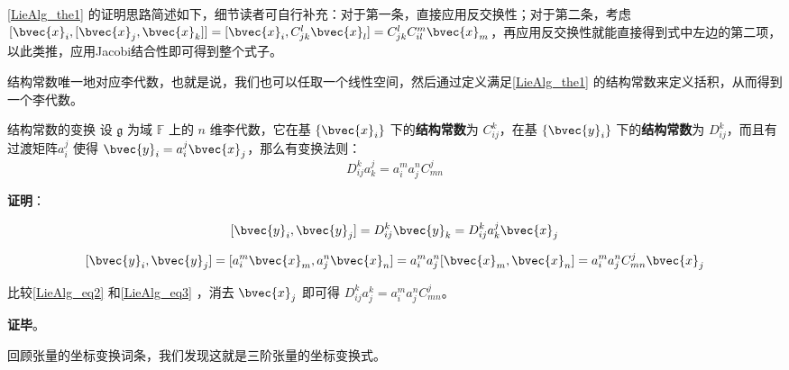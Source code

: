 \autoref{LieAlg_the1} 的证明思路简述如下，细节读者可自行补充：对于第一条，直接应用反交换性；对于第二条，考虑 $[\bvec{x}_i, [\bvec{x}_j, \bvec{x}_k]] = [\bvec{x}_i, C_{jk}^l \bvec{x}_l] = C_{jk}^l C_{il}^m \bvec{x}_m$，再应用反交换性就能直接得到式中左边的第二项，以此类推，应用Jacobi结合性即可得到整个式子。

结构常数唯一地对应李代数，也就是说，我们也可以任取一个线性空间，然后通过定义满足\autoref{LieAlg_the1} 的结构常数来定义括积，从而得到一个李代数。

\begin{theorem}{结构常数的变换}
设 $\mathfrak{g}$ 为域 $\mathbb{F}$ 上的 $n$ 维李代数，它在基 $\{\bvec{x}_i\}$ 下的\textbf{结构常数}为 $C^k_{ij}$，在基 $\{\bvec{y}_i\}$ 下的\textbf{结构常数}为 $D^k_{ij}$，而且有过渡矩阵$a_i^j$ 使得 $\bvec{y}_i=a_i^j\bvec{x}_j$，那么有变换法则：
\begin{equation}
D_{ij}^k a_k^j=a_i^m a_j^n C^j_{mn}
\end{equation}

\end{theorem}

\textbf{证明}：

\begin{equation}\label{LieAlg_eq2}
[\bvec{y}_i, \bvec{y}_j] = D_{ij}^k \bvec{y}_k = D_{ij}^k a_k^j \bvec{x}_j
\end{equation}

\begin{equation}\label{LieAlg_eq3}
[\bvec{y}_i, \bvec{y}_j]=[a_i^m \bvec{x}_m, a_j^n \bvec{x}_n]=a_i^m a_j^n[\bvec{x}_m, \bvec{x}_n]=a_i^m a_j^n C^j_{mn} \bvec{x}_j
\end{equation}

比较\autoref{LieAlg_eq2} 和\autoref{LieAlg_eq3} ，消去 $\bvec{x}_j$ 即可得 $D_{ij}^k a^k_j = a_i^m a_j^n C^j_{mn}$。

\textbf{证毕}。

回顾张量的坐标变换词条，我们发现这就是三阶张量的坐标变换式。






